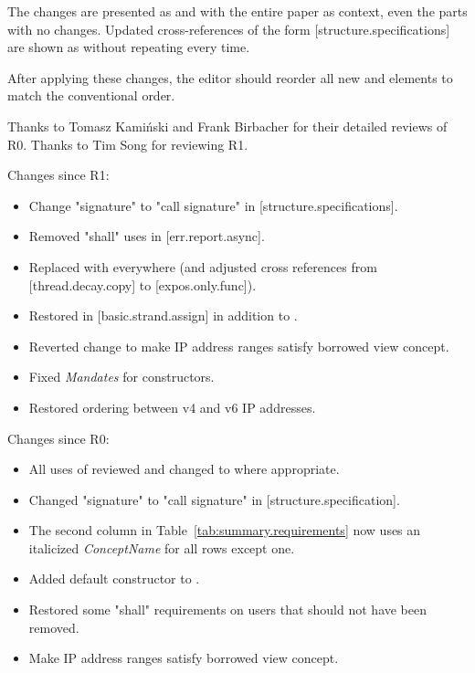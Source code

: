 The changes are presented as  and 
with the entire paper as context, even the parts with no changes.
Updated cross-references of the form \CppXIV{}[structure.specifications] 
are shown as  without repeating
 every time.

After applying these changes, the editor should reorder all new
\constraints and \mandates elements to match the conventional order.

\vspace{2.5cm}

Thanks to Tomasz Kamiński and Frank Birbacher for their detailed reviews of R0.
Thanks to Tim Song for reviewing R1.

Changes since R1:
\begin{itemize}
\item Change "signature" to "call signature" in [structure.specifications].
\item Removed "shall" uses in [err.report.async].
\item Replaced  with  everywhere
  (and adjusted cross references from [thread.decay.copy] to [expos.only.func]).
\item Restored \expects in [basic.strand.assign] in addition to \constraints{}.
\item Reverted change to make IP address ranges satisfy borrowed view concept.
\item Fixed \textit{Mandates} for  constructors.
\item Restored ordering between v4 and v6 IP addresses.
\end{itemize}

Changes since R0:
\begin{itemize}
\item All uses of  reviewed and changed to
   where appropriate.
\item Changed "signature" to "call signature" in [structure.specification].
\item The second column in Table~\ref{tab:summary.requirements} now uses
  an italicized \textit{ConceptName} for all rows except one.
\item Added  default constructor to .
\item Restored some "shall" requirements on users that should not have been removed.
\item Make IP address ranges satisfy borrowed view concept.
\end{itemize}

